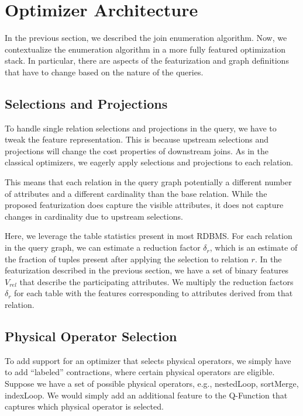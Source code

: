 \section{Optimizer Architecture}
In the previous section, we described the join enumeration algorithm. Now, we contextualize the enumeration algorithm in a more fully featured optimization stack. In particular, there are aspects of the featurization and graph definitions that have to change based on the nature of the queries.

\subsection*{Selections and Projections}
To handle single relation selections and projections in the query, we have to tweak the feature representation. This is because upstream selections and projections will change the cost properties of downstream joins. As in the classical optimizers, we eagerly apply selections and projections to each relation. 

This means that each relation in the query graph potentially a different number of attributes and a different cardinality than the base relation. While the proposed featurization does capture the visible attributes, it does not capture changes in cardinality due to upstream selections. 

Here, we leverage the table statistics present in most RDBMS. For each relation in the query graph, we can estimate a reduction factor $\delta_{r}$, which is an estimate of the fraction of tuples present after applying the selection to relation $r$. 
In the featurization described in the previous section, we have a set of binary features $V_{rel}$ that describe the participating attributes.
We multiply the reduction factors $\delta_r$ for each table with the features corresponding to attributes derived from that relation.

\subsection*{Physical Operator Selection}
To add support for an optimizer that selects physical operators, we simply have to add ``labeled'' contractions, where certain physical operators are eligible. Suppose we have a set of possible physical operators, e.g., \textsf{nestedLoop}, \textsf{sortMerge}, \textsf{indexLoop}. We would simply add an additional feature to the Q-Function that captures which physical operator is selected.

